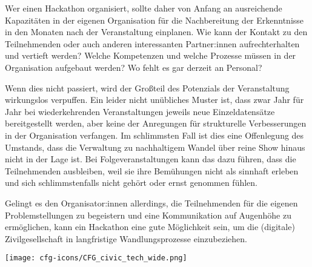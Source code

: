 Wer einen Hackathon organisiert, sollte daher von Anfang an ausreichende Kapazitäten in der eigenen Organisation für die Nachbereitung der Erkenntnisse in den Monaten nach der Veranstaltung einplanen. Wie kann der Kontakt zu den Teilnehmenden oder auch anderen interessanten Partner:innen aufrechterhalten und vertieft werden? Welche Kompetenzen und welche Prozesse müssen in der Organisation aufgebaut werden? Wo fehlt es gar derzeit an Personal?

Wenn dies nicht passiert, wird der Großteil des Potenzials der Veranstaltung wirkungslos verpuffen. Ein leider nicht unübliches Muster ist, dass zwar Jahr für Jahr bei wiederkehrenden Veranstaltungen jeweils neue Einzeldatensätze bereitgestellt werden, aber keine der Anregungen für strukturelle Verbesserungen in der Organisation verfangen. Im schlimmsten Fall ist dies eine Offenlegung des Umstands, dass die Verwaltung zu nachhaltigem Wandel über reine Show hinaus nicht in der Lage ist. Bei Folgeveranstaltungen kann das dazu führen, dass die Teilnehmenden ausbleiben, weil sie ihre Bemühungen nicht als sinnhaft erleben und sich schlimmstenfalls nicht gehört oder ernst genommen fühlen.

Gelingt es den Organisator:innen allerdings, die Teilnehmenden für die eigenen Problemstellungen zu begeistern und eine Kommunikation auf Augenhöhe zu ermöglichen, kann ein Hackathon eine gute Möglichkeit sein, um die (digitale) Zivilgesellschaft in langfristige Wandlungsprozesse einzubeziehen.



\vspace{6cm}
\begin{figure*}[h!]
	\texttt{[image: cfg-icons/CFG\_civic\_tech\_wide.png]}
\end{figure*}




